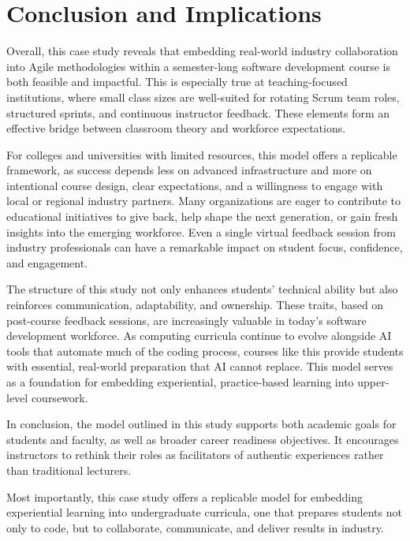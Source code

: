 \documentclass{article}
\begin{document}
\section{Conclusion and Implications}
Overall, this case study reveals that embedding real-world industry collaboration into Agile methodologies within a semester-long software development course is both feasible and impactful. This is especially true at teaching-focused institutions, where small class sizes are well-suited for rotating Scrum team roles, structured sprints, and continuous instructor feedback. These elements form an effective bridge between classroom theory and workforce expectations.

For colleges and universities with limited resources, this model offers a replicable framework, as success depends less on advanced infrastructure and more on intentional course design, clear expectations, and a willingness to engage with local or regional industry partners. Many organizations are eager to contribute to educational initiatives to give back, help shape the next generation, or gain fresh insights into the emerging workforce. Even a single virtual feedback session from industry professionals can have a remarkable impact on student focus, confidence, and engagement.

The structure of this study not only enhances students’ technical ability but also reinforces communication, adaptability, and ownership. These traits, based on post-course feedback sessions, are increasingly valuable in today's software development workforce. As computing curricula continue to evolve alongside AI tools that automate much of the coding process, courses like this provide students with essential, real-world preparation that AI cannot replace. This model serves as a foundation for embedding experiential, practice-based learning into upper-level coursework.

In conclusion, the model outlined in this study supports both academic goals for students and faculty, as well as broader career readiness objectives. It encourages instructors to rethink their roles as facilitators of authentic experiences rather than traditional lecturers.

Most importantly, this case study offers a replicable model for embedding experiential learning into undergraduate curricula, one that prepares students not only to code, but to collaborate, communicate, and deliver results in industry.

\printbibliography
\end{document}
